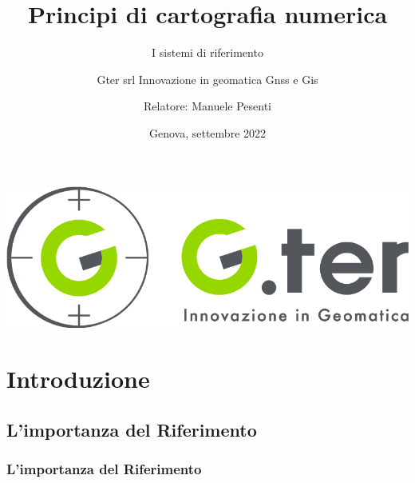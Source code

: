 \documentclass{beamer}
\title{Principi di cartografia numerica}
\subtitle{I sistemi di riferimento}
\author[]{Gter srl Innovazione in geomatica Gnss e Gis}
\author[]{Relatore: Manuele Pesenti}
\date{Genova, settembre 2022}
\begin{document}
{
\addtocounter{framenumber}{-1}  %
\begin{frame}[plain]%
  \titlepage
  			\begin{center}
  				\includegraphics[height=1 cm]{./Gter.png}
  			\end{center}
\end{frame}
}

{

\section{Introduzione}

\subsection{L'importanza del Riferimento}

\begin{frame}
   \frametitle{L'importanza del Riferimento}


\end{frame}}
\end{document}
